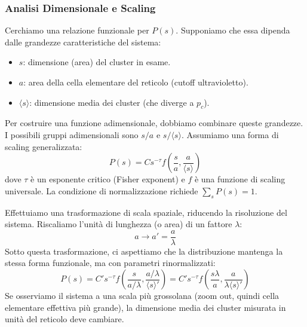 \subsubsection{Analisi Dimensionale e Scaling}
Cerchiamo una relazione funzionale per $P(s)$. Supponiamo che essa dipenda dalle grandezze caratteristiche del sistema:
\begin{itemize}
    \item $s$: dimensione (area) del cluster in esame.
    \item $a$: area della cella elementare del reticolo (cutoff ultravioletto).
    \item $\langle s \rangle$: dimensione media dei cluster (che diverge a $p_c$).
\end{itemize}
Per costruire una funzione adimensionale, dobbiamo combinare queste grandezze. I possibili gruppi adimensionali sono $s/a$ e $s/\langle s \rangle$.
Assumiamo una forma di scaling generalizzata:
\begin{equation}
    P(s) = C s^{-\tau} f\left( \frac{s}{a}, \frac{a}{\langle s \rangle} \right)
\end{equation}
dove $\tau$ è un esponente critico (Fisher exponent) e $f$ è una funzione di scaling universale. La condizione di normalizzazione richiede $\sum_s P(s) = 1$.


\noindent Effettuiamo una trasformazione di scala spaziale, riducendo la risoluzione del sistema.
Riscaliamo l'unità di lunghezza (o area) di un fattore $\lambda$:
\begin{equation}
    a \to a' = \frac{a}{\lambda}
\end{equation}
Sotto questa trasformazione, ci aspettiamo che la distribuzione mantenga la stessa forma funzionale, ma con parametri rinormalizzati:
\begin{equation}
    P(s) = C' s^{-\tau} f\left( \frac{s}{a/\lambda}, \frac{a/\lambda}{\langle s \rangle'} \right) = C' s^{-\tau} f\left( \frac{s \lambda}{a}, \frac{a}{\lambda \langle s \rangle'} \right)
\end{equation}
Se osserviamo il sistema a una scala più grossolana (zoom out, quindi cella elementare effettiva più grande), la dimensione media dei cluster misurata in unità del reticolo deve cambiare.

